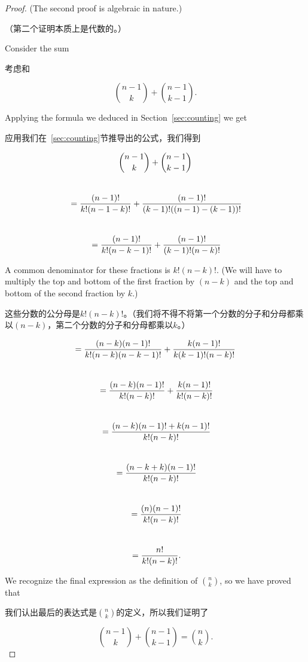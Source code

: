 \begin{proof}
(The second proof is algebraic in nature.)

（第二个证明本质上是代数的。）

Consider the sum 

考虑和

\[ \binom{n-1}{k} + \binom{n-1}{k-1}.\]

Applying the formula we deduced in Section~\ref{sec:counting}
we get 

应用我们在~\ref{sec:counting}节推导出的公式，我们得到

\begin{gather*} 
\binom{n-1}{k} + \binom{n-1}{k-1} \\
\rule{0pt}{36pt} = \frac{(n-1)!}{k! (n-1-k)!}  + \frac{(n-1)!}{(k-1)! ((n-1)-(k-1))!} \\
\rule{0pt}{36pt} = \frac{(n-1)!}{k! (n-k-1)!}  + \frac{(n-1)!}{(k-1)! (n-k)!} \\
\end{gather*}

A common denominator for these fractions is $k!(n-k)!$.  (We will have
to multiply the top and bottom of the first fraction by $(n-k)$ and the
top and bottom of the second fraction by $k$.)

这些分数的公分母是$k!(n-k)!$。（我们将不得不将第一个分数的分子和分母都乘以$(n-k)$，第二个分数的分子和分母都乘以$k$。）

\begin{gather*} 
= \frac{(n-k)(n-1)!}{k! (n-k) (n-k-1)!}  + \frac{k (n-1)!}{k (k-1)! (n-k)!} \\
\rule{0pt}{36pt} = \frac{(n-k)(n-1)!}{k! (n-k)!}  + \frac{k (n-1)!}{k! (n-k)!} \\
\rule{0pt}{36pt} = \frac{(n-k)(n-1)! + k (n-1)!}{k! (n-k)!} \\
\rule{0pt}{36pt} = \frac{(n-k+k)(n-1)!}{k! (n-k)!} \\
\rule{0pt}{36pt} = \frac{(n)(n-1)!}{k! (n-k)!} \\
\rule{0pt}{36pt} = \frac{n!}{k! (n-k)!}. \\
\end{gather*}


We recognize the final expression as the definition of $\binom{n}{k}$,
so we have proved that

我们认出最后的表达式是$\binom{n}{k}$的定义，所以我们证明了

\[ \binom{n-1}{k} + \binom{n-1}{k-1} = \binom{n}{k}. \]
\end{proof}

